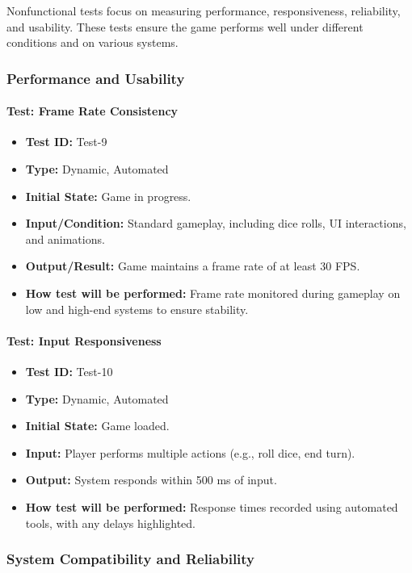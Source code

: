 \documentclass[12pt, titlepage]{article}
\begin{document}
Nonfunctional tests focus on measuring performance, responsiveness, reliability, and usability. These tests ensure the game performs well under different conditions and on various systems.

\subsubsection{Performance and Usability}

\paragraph{Test: Frame Rate Consistency}
\begin{itemize}
    \item \textbf{Test ID:} Test-9
    \item \textbf{Type:} Dynamic, Automated
    \item \textbf{Initial State:} Game in progress.
    \item \textbf{Input/Condition:} Standard gameplay, including dice rolls, UI interactions, and animations.
    \item \textbf{Output/Result:} Game maintains a frame rate of at least 30 FPS.
    \item \textbf{How test will be performed:} Frame rate monitored during gameplay on low and high-end systems to ensure stability.
\end{itemize}

\paragraph{Test: Input Responsiveness}
\begin{itemize}
    \item \textbf{Test ID:} Test-10
    \item \textbf{Type:} Dynamic, Automated
    \item \textbf{Initial State:} Game loaded.
    \item \textbf{Input:} Player performs multiple actions (e.g., roll dice, end turn).
    \item \textbf{Output:} System responds within 500 ms of input.
    \item \textbf{How test will be performed:} Response times recorded using automated tools, with any delays highlighted.
\end{itemize}

\subsubsection{System Compatibility and Reliability}
\end{document}
